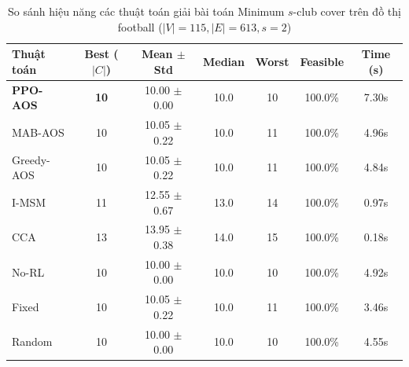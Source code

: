 \begin{table}[htbp]
\centering
\caption{So sánh hiệu năng các thuật toán giải bài toán Minimum $s$-club cover trên đồ thị football ($|V|=115, |E|=613, s=2$)}
\label{tab:results_football}
\begin{tabular}{lcccccc}
\hline
\textbf{Thuật toán} & \textbf{Best ($|C|$)} & \textbf{Mean $\pm$ Std} & \textbf{Median} & \textbf{Worst} & \textbf{Feasible} & \textbf{Time (s)} \\
\hline
\textbf{PPO-AOS} & \textbf{10} & 10.00 $\pm$ 0.00 & 10.0 & 10 & 100.0\% & 7.30s \\
MAB-AOS & 10 & 10.05 $\pm$ 0.22 & 10.0 & 11 & 100.0\% & 4.96s \\
Greedy-AOS & 10 & 10.05 $\pm$ 0.22 & 10.0 & 11 & 100.0\% & 4.84s \\
I-MSM & 11 & 12.55 $\pm$ 0.67 & 13.0 & 14 & 100.0\% & 0.97s \\
CCA & 13 & 13.95 $\pm$ 0.38 & 14.0 & 15 & 100.0\% & 0.18s \\
No-RL & 10 & 10.00 $\pm$ 0.00 & 10.0 & 10 & 100.0\% & 4.92s \\
Fixed & 10 & 10.05 $\pm$ 0.22 & 10.0 & 11 & 100.0\% & 3.46s \\
Random & 10 & 10.00 $\pm$ 0.00 & 10.0 & 10 & 100.0\% & 4.55s \\
\hline
\end{tabular}
\end{table}
